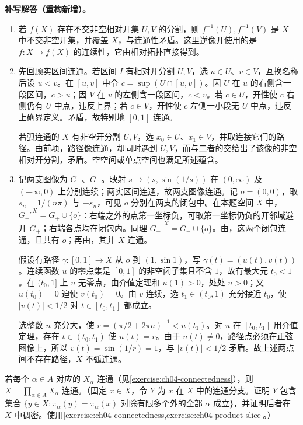\documentclass[../../main.tex]{subfiles}%
\begin{document}
\begin{solution}
\textbf{补写解答（重构新增）。}
\begin{enumerate}
\item 若 $f(X)$ 存在不交非空相对开集 $U,V$ 的分割，则 $f^{-1}(U),f^{-1}(V)$ 是 $X$ 中不交非空开集，并覆盖 $X$，与连通性矛盾。这里逆像开使用的是 $f:X\to f(X)$ 的连续性，它由相对拓扑直接得到。
\item 先回顾实区间连通。若区间 $I$ 有相对开分割 $U,V$，选 $u\in U$、$v\in V$，互换名称后设 $u<v$。在 $[u,v]$ 中令 $c=\sup(U\cap[u,v])$。因 $U$ 在 $u$ 的右侧含一段区间，$c>u$；因 $V$ 在 $v$ 的左侧含一段区间，$c<v$。若 $c\in U$，开性使 $c$ 右侧仍有 $U$ 中点，违反上界；若 $c\in V$，开性使 $c$ 左侧一小段无 $U$ 中点，违反上确界定义。矛盾，故特别地 $[0,1]$ 连通。

若弧连通的 $X$ 有非空开分割 $U,V$，选 $x_0\in U$、$x_1\in V$，并取连接它们的路径。由前项，路径像连通，却同时遇到 $U,V$，而与二者的交给出了该像的非空相对开分割，矛盾。空空间或单点空间也满足所述蕴含。
\item 记两支图像为 $G_+$、$G_-$。映射 $s\mapsto(s,\sin(1/s))$ 在 $(0,\infty)$ 及 $(-\infty,0)$ 上分别连续；两实区间连通，故两支图像连通。记 $o=(0,0)$，取 $s_n=1/(n\pi)$ 与 $-s_n$，可见 $o$ 分别在两支的闭包中。在本题空间 $X$ 中，$\overline{G_+}^{,X}=G_+\cup\{o\}$：右端之外的点第一坐标负，可取第一坐标仍负的开邻域避开 $G_+$；右端各点均在闭包内。同理 $\overline{G_-}^{,X}=G_-\cup\{o\}$。由，这两个闭包连通，且共有 $o$；再由，其并 $X$ 连通。

假设有路径 $\gamma:[0,1]\to X$ 从 $o$ 到 $(1,\sin1)$，写 $\gamma(t)=(u(t),v(t))$。连续函数 $u$ 的零点集是 $[0,1]$ 的非空闭子集且不含 $1$，故有最大元 $t_0<1$。在 $(t_0,1]$ 上 $u$ 无零点，由介值定理和 $u(1)>0$，处处 $u>0$；又 $u(t_0)=0$ 迫使 $v(t_0)=0$。由 $v$ 连续，选 $t_1\in(t_0,1)$ 充分接近 $t_0$，使 $|v(t)|<1/2$ 对 $t\in[t_0,t_1]$ 都成立。

选整数 $n$ 充分大，使 $r=(\pi/2+2\pi n)^{-1}<u(t_1)$。对 $u$ 在 $[t_0,t_1]$ 用介值定理，存在 $t\in(t_0,t_1)$ 使 $u(t)=r$。由于 $u(t)\ne0$，路径点必须在正弦图像上，所以 $v(t)=\sin(1/r)=1$，与 $|v(t)|<1/2$ 矛盾。故上述两点间不存在路径，$X$ 不弧连通。
\end{enumerate}
\end{solution}
\begin{exercise}\label{exercise:ch04-connected-products}
若每个 $\alpha\in A$ 对应的 $X_\alpha$ 连通（见\cref{exercise:ch04-connectedness}），则 $X=\prod_{\alpha\in A}X_\alpha$ 连通。（固定 $x\in X$，令 $Y$ 为 $x$ 在 $X$ 中的连通分支。证明 $Y$ 包含集合 $\{y\in X:\pi_\alpha(y)=\pi_\alpha(x)\text{ 对除有限多个外的全部 }\alpha\text{ 成立}\}$，并证明后者在 $X$ 中稠密。使用\cref{exercise:ch04-connectedness,exercise:ch04-product-slice}。）
\end{exercise}
\end{document}
